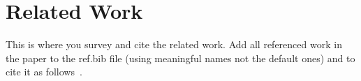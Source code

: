 \section{Related Work}
\label{sec:related-work}

This is where you survey and cite the related work. Add all referenced work in the paper to the ref.bib file (using meaningful names not the default ones) and to cite it as follows~\cite{hydra1}.

